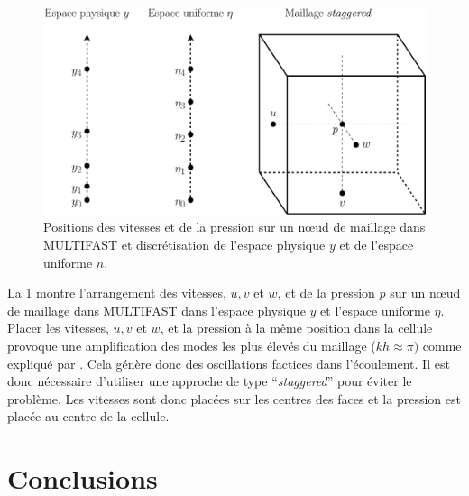 \begin{figure}[!hbtp]
    \centering
    \includegraphics[width=0.75\linewidth]{Chap2/Pictures/Domaine_calcul/Node_MULTIFAST.pdf}
    \caption{Positions des vitesses et de la pression sur un nœud de maillage dans MULTIFAST et discrétisation de l'espace physique $y$ et de l'espace uniforme $n$.}
    \label{fig/node_MULTIFAST}
\end{figure}

La \cref{fig/node_MULTIFAST} montre l'arrangement des vitesses, $u,v$ et $w$, et de la pression $p$ sur un nœud de maillage dans MULTIFAST dans l'espace physique $y$ et l'espace uniforme $\eta$. Placer les vitesses, $u,v$ et $w$, et la pression à la même position dans la cellule provoque une amplification des modes les plus élevés du maillage ($kh \approx \pi)$ comme expliqué par \citet{Ferziger2002}. Cela génère donc des oscillations factices dans l'écoulement. Il est donc nécessaire d'utiliser une approche de type \foreignquote{french}{\textit{staggered}} pour éviter le problème. Les vitesses sont donc placées sur les centres des faces et la pression est placée au centre de la cellule.

\clearpage
\section{Conclusions}

